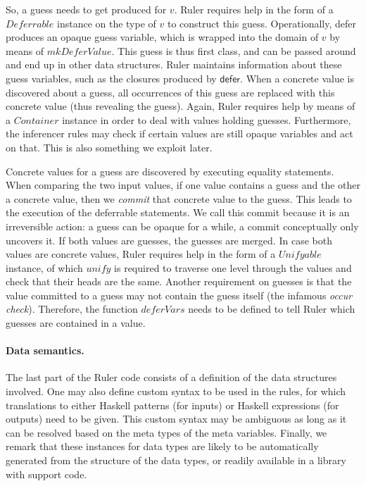 \documentclass[preprint,natbib]{sigplanconf}
\newcommand{\Conid}[1]{\mathit{#1}}
\newcommand{\Varid}[1]{\mathit{#1}}
\newcommand\Defer{\mathsf{defer}}
\begin{document}
    So, a guess needs to get produced for $v$. Ruler requires
    help in the form of a \ensuremath{\Conid{Deferrable}} instance on the type of $v$ to
    construct this guess. Operationally, defer produces an opaque
    guess variable, which is wrapped into the domain of $v$ by means
    of \ensuremath{\Varid{mkDeferValue}}.  This guess is thus first class, and can be
    passed around and end up in other data structures. Ruler maintains
    information about these guess variables, such as the closures
    produced by $\Defer$. When a concrete value is discovered about a
    guess, all occurrences of this guess are replaced with this
    concrete value (thus revealing the guess). Again, Ruler requires
    help by means of a \ensuremath{\Conid{Container}} instance in order to deal with
    values holding guesses. Furthermore, the inferencer rules may
    check if certain values are still opaque variables and act on
    that. This is also something we exploit later.

    Concrete values for a guess are discovered by executing equality
    statements. When comparing the two input values, if one value
    contains a guess and the other a concrete value, then we {\it
    commit} that concrete value to the guess. This leads to the
    execution of the deferrable statements. We call this commit because it
    is an irreversible action: a guess can be opaque for a while, a
    commit conceptually only uncovers it. If both values are guesses,
    the guesses are merged. In case both values are concrete values,
    Ruler requires help in the form of a \ensuremath{\Conid{Unifyable}} instance, of
    which \ensuremath{\Varid{unify}} is required to traverse one level through the values
    and check that their heads are the same. Another requirement on
    guesses is that the value committed to a guess may not contain the
    guess itself (the infamous {\it occur check}). Therefore, the
    function \ensuremath{\Varid{deferVars}} needs to be defined to tell Ruler which
    guesses are contained in a value.

    \paragraph{Data semantics.}  The last part of the Ruler code
    consists of a definition of the data structures involved. One may
    also define custom syntax to be used in the rules, for which
    translations to either Haskell patterns (for inputs) or Haskell
    expressions (for outputs) need to be given. This custom syntax may
    be ambiguous as long as it can be resolved based on the meta types
    of the meta variables.  Finally, we remark that these instances for
    data types are likely to be automatically generated from the
    structure of the data types, or readily available in a library
    with support code.\\
\end{document}
